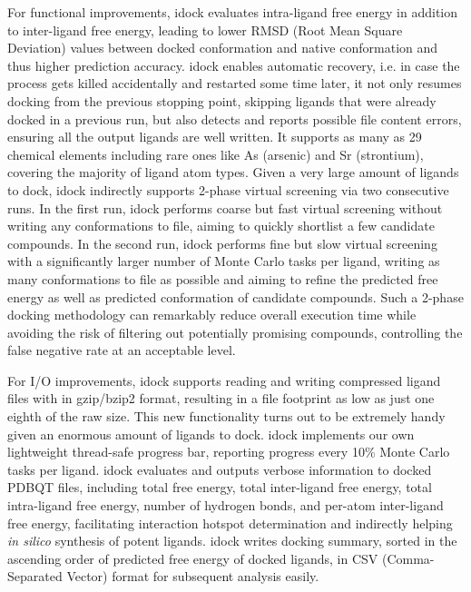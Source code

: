 For functional improvements, idock evaluates intra-ligand free energy in addition to inter-ligand free energy, leading to lower RMSD (Root Mean Square Deviation) values between docked conformation and native conformation and thus higher prediction accuracy. idock enables automatic recovery, i.e. in case the process gets killed accidentally and restarted some time later, it not only resumes docking from the previous stopping point, skipping ligands that were already docked in a previous run, but also detects and reports possible file content errors, ensuring all the output ligands are well written. It supports as many as 29 chemical elements including rare ones like As (arsenic) and Sr (strontium), covering the majority of ligand atom types. Given a very large amount of ligands to dock, idock indirectly supports 2-phase virtual screening via two consecutive runs. In the first run, idock performs coarse but fast virtual screening without writing any conformations to file, aiming to quickly shortlist a few candidate compounds. In the second run, idock performs fine but slow virtual screening with a significantly larger number of Monte Carlo tasks per ligand, writing as many conformations to file as possible and aiming to refine the predicted free energy as well as predicted conformation of candidate compounds. Such a 2-phase docking methodology can remarkably reduce overall execution time while avoiding the risk of filtering out potentially promising compounds, controlling the false negative rate at an acceptable level.

For I/O improvements, idock supports reading and writing compressed ligand files with in gzip/bzip2 format, resulting in a file footprint as low as just one eighth of the raw size. This new functionality turns out to be extremely handy given an enormous amount of ligands to dock. idock implements our own lightweight thread-safe progress bar, reporting progress every 10\% Monte Carlo tasks per ligand. idock evaluates and outputs verbose information to docked PDBQT files, including total free energy, total inter-ligand free energy, total intra-ligand free energy, number of hydrogen bonds, and per-atom inter-ligand free energy, facilitating interaction hotspot determination and indirectly helping \textit{in silico} synthesis of potent ligands. idock writes docking summary, sorted in the ascending order of predicted free energy of docked ligands, in CSV (Comma-Separated Vector) format for subsequent analysis easily.


